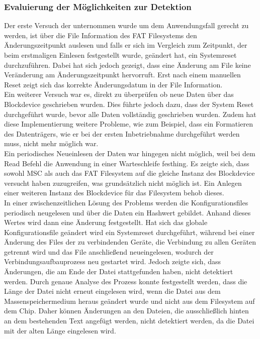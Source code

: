 \subsubsection{Evaluierung der Möglichkeiten zur Detektion}
Der erste Versuch der unternommen wurde um dem Anwendungsfall gerecht zu werden, ist über die File Information des \ac{FAT} Filesystems den Änderungszeitpunkt auslesen und falls er sich im Vergleich zum Zeitpunkt, der beim erstmaligen Einlesen festgestellt wurde, geändert hat, ein Systemreset durchzuführen. Dabei hat sich jedoch gezeigt, dass eine Änderung am File keine Veränderung am Änderungszeitpunkt hervorruft. Erst nach einem manuellen Reset zeigt sich das korrekte Änderungsdatum in der File Information. \\
Ein weiterer Versuch war es, direkt zu überprüfen ob neue Daten über das Blockdevice geschrieben wurden. Dies führte jedoch dazu, dass der System Reset durchgeführt wurde, bevor alle Daten vollständig geschrieben wurden. Zudem hat diese Implementierung weitere Probleme, wie zum Beispiel, dass ein Formatieren des Datenträgers, wie er bei der ersten Inbetriebnahme durchgeführt werden muss, nicht mehr möglich war. \\
Ein periodisches Neueinlesen der Daten war hingegen nicht möglich, weil bei dem Read Befehl die Anwendung in einer Warteschleife festhing. Es zeigte sich, dass sowohl \ac{MSC} als auch das \ac{FAT} Filesystem auf die gleiche Instanz des Blockdevice versucht haben zuzugreifen, was grundsätzlich nicht möglich ist. Ein Anlegen einer weiteren Instanz des Blockdevice für das Filesystem behob dieses. \\
In einer zwischenzeitlichen Lösung des Problems werden die Konfigurationsfiles periodisch neugelesen und über die Daten ein Hashwert gebildet. Anhand dieses Wertes wird dann eine Änderung festgestellt. Hat sich das globale Konfigurationsfile geändert wird ein Systemreset durchgeführt, während bei einer Änderung des Files der zu verbindenden Geräte, die Verbindung zu allen Geräten getrennt wird und das File anschließend neueingelesen, wodurch der Verbindungsaufbauprozess neu gestartet wird. Jedoch zeigte sich, dass Änderungen, die am Ende der Datei stattgefunden haben, nicht detektiert werden. Durch genaue Analyse des Prozess konnte festgestellt werden, dass die Länge der Datei nicht erneut eingelesen wird, wenn die Datei aus dem Massenspeichermedium heraus geändert wurde und nicht aus dem Filesystem auf dem Chip. Daher können Änderungen an den Dateien, die ausschließlich hinten an dem bestehenden Text angefügt werden, nicht detektiert werden, da die Datei mit der alten Länge eingelesen wird.

